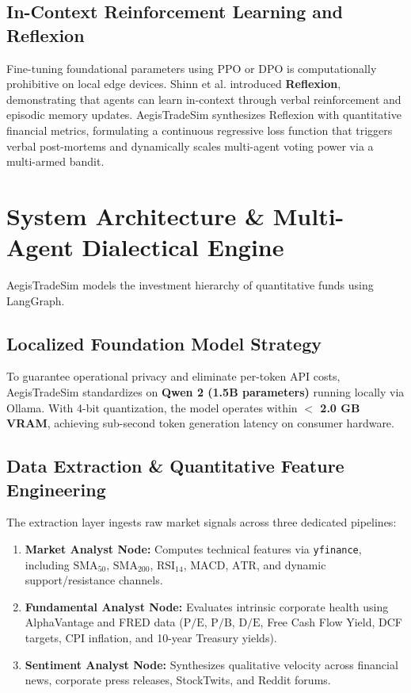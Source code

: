 \documentclass[conference]{IEEEtran}
\begin{document}
\subsection{In-Context Reinforcement Learning and Reflexion}
Fine-tuning foundational parameters using PPO or DPO is computationally prohibitive on local edge devices. Shinn et al. introduced \textbf{Reflexion}, demonstrating that agents can learn in-context through verbal reinforcement and episodic memory updates. AegisTradeSim synthesizes Reflexion with quantitative financial metrics, formulating a continuous regressive loss function that triggers verbal post-mortems and dynamically scales multi-agent voting power via a multi-armed bandit.

\section{System Architecture \& Multi-Agent Dialectical Engine}
AegisTradeSim models the investment hierarchy of quantitative funds using LangGraph.

\subsection{Localized Foundation Model Strategy}
To guarantee operational privacy and eliminate per-token API costs, AegisTradeSim standardizes on \textbf{Qwen 2 (1.5B parameters)} running locally via Ollama. With 4-bit quantization, the model operates within \textbf{$<$ 2.0 GB VRAM}, achieving sub-second token generation latency on consumer hardware.

\subsection{Data Extraction \& Quantitative Feature Engineering}
The extraction layer ingests raw market signals across three dedicated pipelines:
\begin{enumerate}
    \item \textbf{Market Analyst Node:} Computes technical features via \texttt{yfinance}, including $\text{SMA}_{50}$, $\text{SMA}_{200}$, $\text{RSI}_{14}$, $\text{MACD}$, $\text{ATR}$, and dynamic support/resistance channels.
    \item \textbf{Fundamental Analyst Node:} Evaluates intrinsic corporate health using AlphaVantage and FRED data ($\text{P/E}$, $\text{P/B}$, $\text{D/E}$, Free Cash Flow Yield, DCF targets, CPI inflation, and 10-year Treasury yields).
    \item \textbf{Sentiment Analyst Node:} Synthesizes qualitative velocity across financial news, corporate press releases, StockTwits, and Reddit forums.
\end{enumerate}
\end{document}
